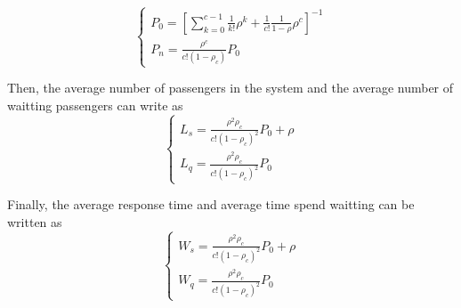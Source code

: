 \documentclass{mcmthesis}
\begin{document}
\begin{equation}    
\left  \{
       \begin{array}{lr}
           P_0=[\sum\limits_{k=0}^{c-1}\frac{1}{k!}\rho ^k+\frac{1}{c!}\frac{1}{1-\rho}\rho ^c]^{-1}\\ \label{eq3}
            P_n=\frac{\rho ^c}{c!(1-\rho_c)}P_0
        \end{array}
\right.
\end{equation}


Then, the average number of passengers in the system and the average number of waitting passengers can write as
\begin{equation}    
\left  \{
       \begin{array}{lr}
           L_s=\frac{\rho ^2\rho_c}{c!(1-\rho_c)^2}P_0 +\rho \\ \label{eq4}
          L_q=\frac{\rho ^2\rho_c}{c!(1-\rho_c)^2}P_0 
        \end{array}
\right.
\end{equation}

Finally, the average response time and average time spend waitting can be written as
\begin{equation}    
\left  \{
       \begin{array}{lr}
           W_s=\frac{\rho ^2\rho_c}{c!(1-\rho_c)^2}P_0 +\rho \\ \label{eq5}
          W_q=\frac{\rho ^2\rho_c}{c!(1-\rho_c)^2}P_0 
        \end{array}
\right.
\end{equation}

\end{document}
